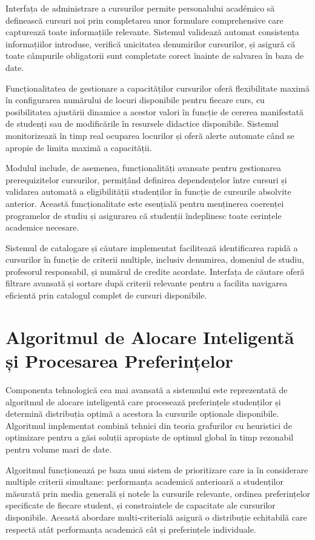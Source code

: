\documentclass[12pt,a4paper]{report}
\begin{document}
Interfața de administrare a cursurilor permite personalului académico să definească cursuri noi prin completarea unor formulare comprehensive care capturează toate informațiile relevante. Sistemul validează automat consistența informațiilor introduse, verifică unicitatea denumirilor cursurilor, și asigură că toate câmpurile obligatorii sunt completate corect înainte de salvarea în baza de date.

Funcționalitatea de gestionare a capacităților cursurilor oferă flexibilitate maximă în configurarea numărului de locuri disponibile pentru fiecare curs, cu posibilitatea ajustării dinamice a acestor valori în funcție de cererea manifestată de studenți sau de modificările în resursele didactice disponibile. Sistemul monitorizează în timp real ocuparea locurilor și oferă alerte automate când se apropie de limita maximă a capacității.

Modulul include, de asemenea, funcționalități avansate pentru gestionarea prerequizitelor cursurilor, permițând definirea dependențelor între cursuri și validarea automată a eligibilității studenților în funcție de cursurile absolvite anterior. Această funcționalitate este esențială pentru menținerea coerenței programelor de studiu și asigurarea că studenții îndeplinesc toate cerințele academice necesare.

Sistemul de catalogare și căutare implementat facilitează identificarea rapidă a cursurilor în funcție de criterii multiple, inclusiv denumirea, domeniul de studiu, profesorul responsabil, și numărul de credite acordate. Interfața de căutare oferă filtrare avansată și sortare după criterii relevante pentru a facilita navigarea eficientă prin catalogul complet de cursuri disponibile.

\section{Algoritmul de Alocare Inteligentă și Procesarea Preferințelor}

Componenta tehnologică cea mai avansată a sistemului este reprezentată de algoritmul de alocare inteligentă care procesează preferințele studenților și determină distribuția optimă a acestora la cursurile opționale disponibile. Algoritmul implementat combină tehnici din teoria grafurilor cu heuristici de optimizare pentru a găsi soluții apropiate de optimul global în timp rezonabil pentru volume mari de date.

Algoritmul funcționează pe baza unui sistem de prioritizare care ia în considerare multiple criterii simultane: performanța academică anterioară a studenților măsurată prin media generală și notele la cursurile relevante, ordinea preferințelor specificate de fiecare student, și constraintele de capacitate ale cursurilor disponibile. Această abordare multi-criterială asigură o distribuție echitabilă care respectă atât performanța academică cât și preferințele individuale.
\end{document}
